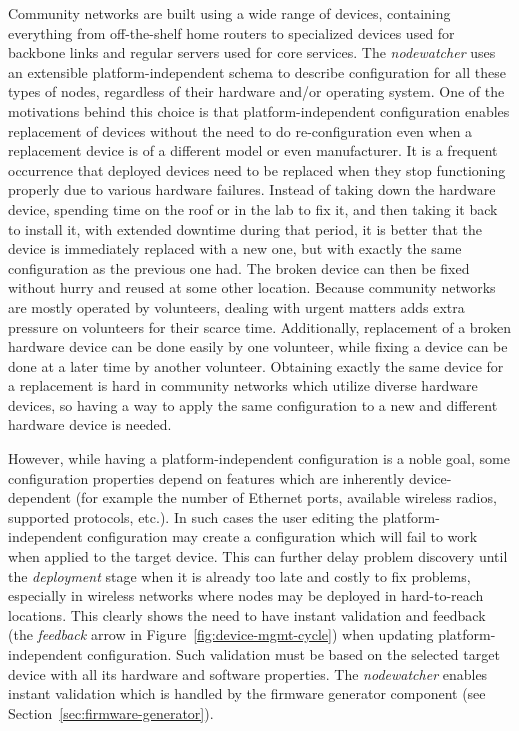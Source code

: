 \documentclass[5p,sort&compress]{elsarticle}
\newcommand{\nodewatcher}{\textit{nodewatcher}}
\begin{document}
Community networks are built using a wide range of devices, containing everything from off-the-shelf home routers to specialized devices used for backbone links and regular servers used for core services.
The \nodewatcher{} uses an extensible platform-independent schema to describe configuration for all these types of nodes, regardless of their hardware and/or operating system.
One of the motivations behind this choice is that platform-independent configuration enables replacement of devices without the need to do re-configuration even when a replacement device is of a different model or even manufacturer.
It is a frequent occurrence that deployed devices need to be replaced when they stop functioning properly due to various hardware failures.
Instead of taking down the hardware device, spending time on the roof or in the lab to fix it, and then taking it back to install it, with extended downtime during that period, it is better that the device is immediately replaced with a new one, but with exactly the same configuration as the previous one had.
The broken device can then be fixed without hurry and reused at some other location.
Because community networks are mostly operated by volunteers, dealing with urgent matters adds extra pressure on volunteers for their scarce time.
Additionally, replacement of a broken hardware device can be done easily by one volunteer, while fixing a device can be done at a later time by another volunteer.
Obtaining exactly the same device for a replacement is hard in community networks which utilize diverse hardware devices, so having a way to apply the same configuration to a new and different hardware device is needed.

However, while having a platform-independent configuration is a noble goal, some configuration properties depend on features which are inherently device-dependent (for example the number of Ethernet ports, available wireless radios, supported protocols, etc.).
In such cases the user editing the platform-independent configuration may create a configuration which will fail to work when applied to the target device.
This can further delay problem discovery until the \textit{deployment} stage when it is already too late and costly to fix problems, especially in wireless networks where nodes may be deployed in hard-to-reach locations.
This clearly shows the need to have instant validation and feedback (the \textit{feedback} arrow in Figure~\ref{fig:device-mgmt-cycle}) when updating platform-independent configuration.
Such validation must be based on the selected target device with all its hardware and software properties.
The \nodewatcher{} enables instant validation which is handled by the firmware generator component (see Section~\ref{sec:firmware-generator}).
\end{document}
